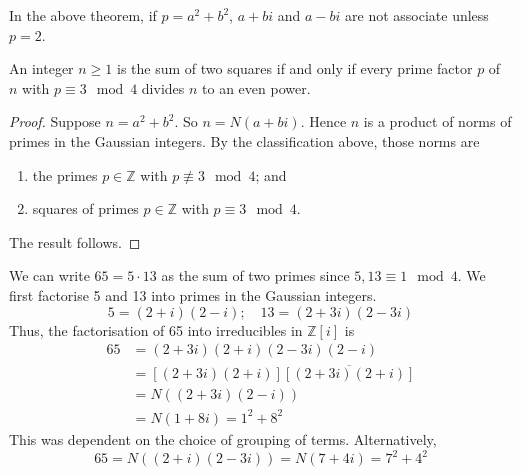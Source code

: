 \begin{remark}
	In the above theorem, if \( p = a^2 + b^2 \), \( a+bi \) and \( a-bi \) are not associate unless \( p = 2 \).
\end{remark}
\begin{corollary}
	An integer \( n \geq 1 \) is the sum of two squares if and only if every prime factor \( p \) of \( n \) with \( p \equiv 3 \mod 4 \) divides \( n \) to an even power.
\end{corollary}
\begin{proof}
	Suppose \( n = a^2 + b^2 \).
	So \( n = N(a+bi) \).
	Hence \( n \) is a product of norms of primes in the Gaussian integers.
	By the classification above, those norms are
	\begin{enumerate}
		\item the primes \( p \in \mathbb Z \) with \( p \not\equiv 3 \mod 4 \); and
		\item squares of primes \( p \in \mathbb Z \) with \( p \equiv 3 \mod 4 \).
	\end{enumerate}
	The result follows.
\end{proof}
\begin{example}
	We can write \( 65 = 5 \cdot 13 \) as the sum of two primes since \( 5, 13 \equiv 1 \mod 4 \).
	We first factorise 5 and 13 into primes in the Gaussian integers.
	\[
		5 = (2+i)(2-i);\quad 13 = (2+3i)(2-3i)
	\]
	Thus, the factorisation of 65 into irreducibles in \( \mathbb Z[i] \) is
	\begin{align*}
		65 & = (2+3i)(2+i)(2-3i)(2-i)                \\
		   & = [(2+3i)(2+i)]\overline{[(2+3i)(2+i)]} \\
		   & = N((2+3i)(2-i))                        \\
		   & = N(1+8i) = 1^2 + 8^2
	\end{align*}
	This was dependent on the choice of grouping of terms.
	Alternatively,
	\[
		65 = N((2+i)(2-3i)) = N(7+4i) = 7^2 + 4^2
	\]
\end{example}

